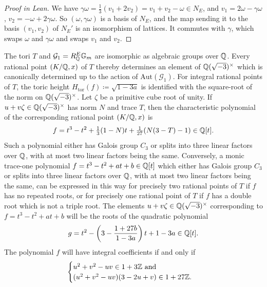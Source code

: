 \begin{proof}[Proof in Lean]

\leanok

We have $\gamma\omega=\tfrac13(v_1+2v_2)=v_1+v_2-\omega\in N_E$, and $v_1=2\omega-\gamma\omega$, $v_2=-\omega+2\gamma\omega$. So $(\omega,\gamma\omega)$ is a basis of $N_E$, and the map sending it to the basis $(v_1,v_2)$ of $N_E'$ is an isomorphism of lattices. It commutes with $\gamma$, which swaps $\omega$ and $\gamma\omega$ and swaps $v_1$ and $v_2$.

\end{proof}

\begin{proposition}

\label{prop:cyclotomicParametrization}


\leanok



 The tori $T$ and $\mathcal G_1 = R^E_{\mathbb{Q}} \mathbb{G}_m$ are isomorphic as algebraic groups over $\mathbb{Q}$. Every rational point $(K/\mathbb{Q},x)$ of $T$ thereby determines an element of $\mathbb{Q}(\sqrt{-3})^\times$ which is canonically determined up to the action of $\mathrm{Aut}(\mathcal G_1)$. For integral rational points of $T$, the toric height $H_{\mathrm{tor}}(f)\coloneqq\sqrt{1-3a}$ is identified with the square-root of the norm on $\mathbb{Q}(\sqrt{-3})^\times$. Let $\zeta$ be a primitive cube root of unity. If $u+v\zeta \in \mathbb{Q}(\sqrt{-3})^\times$ has norm $N$ and trace $T$, then the characteristic polynomial of the corresponding rational point $(K/\mathbb{Q},x)$ is \begin{equation*} f=t^3-t^2+\tfrac{1}{3}(1 - N)t+\tfrac{1}{27}(N(3-T)-1) \in \mathbb{Q}[t]. \end{equation*} Such a polynomial either has Galois group $C_3$ or splits into three linear factors over $\mathbb{Q}$, with at most two linear factors being the same. Conversely, a monic trace-one polynomial $f=t^3-t^2+at+b \in \mathbb{Q}[t]$ which either has Galois group $C_3$ or splits into three linear factors over $\mathbb{Q}$, with at most two linear factors being the same, can be expressed in this way for precisely two rational points of $T$ if $f$ has no repeated roots, or for precisely one rational point of $T$ if $f$ has a double root which is not a triple root. The elements $u+v\zeta \in \mathbb{Q}(\sqrt{-3})^\times$ corresponding to $f=t^3-t^2+at+b$ will be the roots of the quadratic polynomial \begin{equation*} g = t^2 - \left(3-\frac{1+27b}{1-3a}\right)t + 1-3a \in \mathbb{Q}[t]. \end{equation*} The polynomial $f$ will have integral coefficients if and only if \begin{equation*} \begin{cases} u^2+v^2-uv \in 1+3 \mathbb{Z} \text{ and }\\ (u^2+v^2-uv)(3-2u+v) \in 1+27 \mathbb{Z}. \end{cases} \end{equation*} 

\end{proposition}

